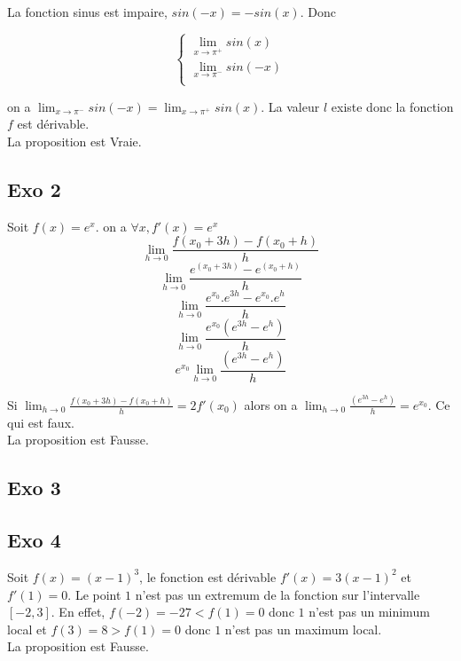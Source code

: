 \documentclass[]{book}
\theoremstyle{definition}
\begin{document}
La fonction sinus est impaire, $sin(-x) = -sin(x)$. Donc

$$ 
\left\{ 
\begin{array}{l}
 \lim_{x \to \pi^{+}} sin(x) \\
 \lim_{x \to \pi^{-}} sin(-x) \\
\end{array}
\right. 
$$

on a $\lim_{x \to \pi^{-}} sin(-x) = \lim_{x \to \pi^{+}} sin(x)$. La valeur $l$ existe donc la fonction $f$ est d\'erivable.\\

La proposition est Vraie.

\subsection*{Exo 2}

Soit $f(x) = e^{x}$. on a $\forall x, f'(x) = e^{x}$
$$\lim_{h \to 0}\frac{f(x_0+3h)-f(x_0+h)}{h}$$
$$\lim_{h \to 0}\frac{e^{(x_0+3h)} - e^{(x_0+h)}}{h}$$
$$\lim_{h \to 0}\frac{e^{x_0}.e^{3h} - e^{x_0}.e^{h}}{h}$$
$$\lim_{h \to 0}\frac{e^{x_0}(e^{3h}-e^{h})}{h}$$
$$e^{x_0}\lim_{h \to 0}\frac{(e^{3h}-e^{h})}{h}$$

Si $\lim_{h \to 0}\frac{f(x_0+3h)-f(x_0+h)}{h} = 2f'(x_0)$ alors on a $\lim_{h \to 0}\frac{(e^{3h}-e^{h})}{h} = e^{x_0}$. Ce qui est faux.\\

La proposition est Fausse.

\subsection*{Exo 3}


\subsection*{Exo 4}
Soit $f(x) = (x-1)^3$, le fonction est d\'erivable $f'(x)=3(x-1)^2$ et $f'(1) = 0$. Le point $1$ n'est pas un extremum de la fonction sur l'intervalle $[-2,3]$. En effet, $f(-2) = -27 < f(1) = 0$ donc $1$ n'est pas un minimum local et $f(3) = 8 > f(1) = 0$ donc $1$ n'est pas un maximum local.\\

La proposition est Fausse.\\

\end{document}
